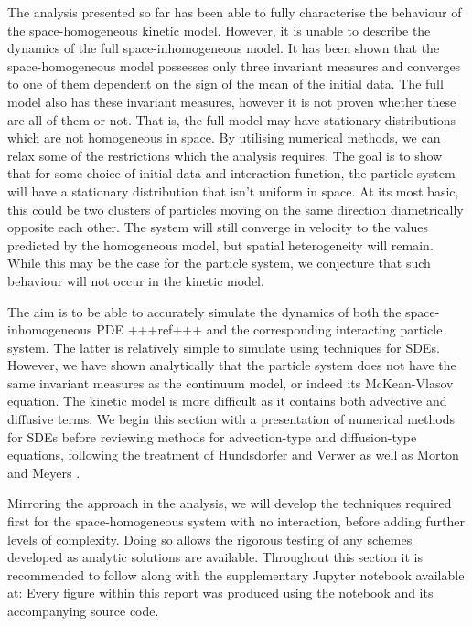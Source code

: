 The analysis presented so far has been able to fully characterise the behaviour of the space-homogeneous kinetic model. However, it is unable to describe the dynamics of the full space-inhomogeneous model. It has been shown that the space-homogeneous model possesses only three invariant measures and converges to one of them dependent on the sign of the mean of the initial data. The full model also has these invariant measures, however it is not proven whether these are all of them or not. That is, the full model may have stationary distributions which are not homogeneous in space. By utilising numerical methods, we can relax some of the restrictions which the analysis requires. The goal is to show that for some choice of initial data and interaction function, the particle system will have a stationary distribution that isn't uniform in space. At its most basic, this could be two clusters of particles moving on the same direction diametrically opposite each other. The system will still converge in velocity to the values predicted by the homogeneous model, but spatial heterogeneity will remain. While this may be the case for the particle system, we conjecture that such behaviour will not occur in the kinetic model.

The aim is to be able to accurately simulate the dynamics of both the space-inhomogeneous PDE +++ref+++ and the corresponding interacting particle system. The latter is relatively simple to simulate using techniques for SDEs. However, we have shown analytically that the particle system does not have the same invariant measures as the continuum model, or indeed its McKean-Vlasov equation. The kinetic model is more difficult as it contains both advective and diffusive terms. We begin this section with a presentation of numerical methods for SDEs before reviewing methods for advection-type and diffusion-type equations, following the treatment of Hundsdorfer and Verwer \cite{Hundsdorfer2007} as well as Morton and Meyers \cite{Morton2005}.

Mirroring the approach in the analysis, we will develop the techniques required first for the space-homogeneous system with no interaction, before adding further levels of complexity. Doing so allows the rigorous testing of any schemes developed as analytic solutions are available. Throughout this section it is recommended to follow along with the supplementary Jupyter notebook available at: 
Every figure within this report was produced using the notebook and its accompanying source code.

